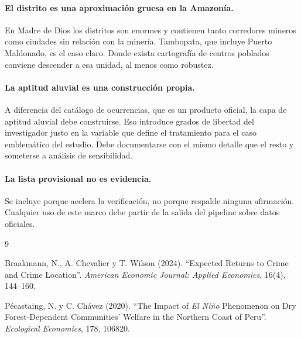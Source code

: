 \documentclass[11pt,a4paper]{article}
\begin{document}
\paragraph{El distrito es una aproximación gruesa en la Amazonía.} En Madre de Dios los distritos son enormes y contienen tanto corredores mineros como ciudades sin relación con la minería. Tambopata, que incluye Puerto Maldonado, es el caso claro. Donde exista cartografía de centros poblados conviene descender a esa unidad, al menos como robustez.

\paragraph{La aptitud aluvial es una construcción propia.} A diferencia del catálogo de ocurrencias, que es un producto oficial, la capa de aptitud aluvial debe construirse. Eso introduce grados de libertad del investigador justo en la variable que define el tratamiento para el caso emblemático del estudio. Debe documentarse con el mismo detalle que el resto y someterse a análisis de sensibilidad.

\paragraph{La lista provisional no es evidencia.} Se incluye porque acelera la verificación, no porque respalde ninguna afirmación. Cualquier uso de este marco debe partir de la salida del pipeline sobre datos oficiales.

\begin{thebibliography}{9}
\small

Braakmann, N., A. Chevalier y T. Wilson (2024). ``Expected Returns to Crime and Crime Location''. \emph{American Economic Journal: Applied Economics}, 16(4), 144--160.

Pécastaing, N. y C. Chávez (2020). ``The Impact of \emph{El Niño} Phenomenon on Dry Forest-Dependent Communities' Welfare in the Northern Coast of Peru''. \emph{Ecological Economics}, 178, 106820.

\end{thebibliography}
\end{document}
